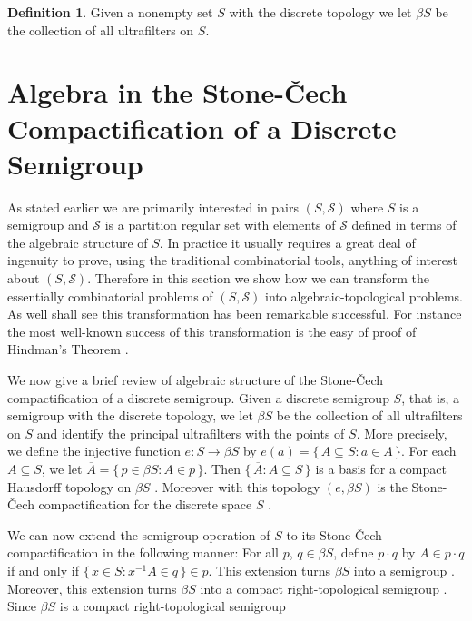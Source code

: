 \documentclass[12pt]{article}
\theoremstyle{plain}
\theoremstyle{definition}
\newtheorem{defn}[thm]{Definition}
\newcommand{\calS}{\mathcal{S}}
\begin{document}
\begin{defn}
  Given a nonempty set $S$ with the discrete topology we let $\beta S$ be the collection of all ultrafilters on $S$. 
\end{defn}

\section{Algebra in the Stone-\v{C}ech Compactification of a Discrete Semigroup}

As stated earlier we are primarily interested in pairs $(S, \calS)$ where $S$ is a semigroup and $\calS$ is a partition regular set with elements of $\calS$ defined in terms of the algebraic structure of $S$.
In practice it usually requires a great deal of ingenuity to prove, using the traditional combinatorial tools, anything of interest about $(S, \calS)$. 
Therefore in this section we show how we can transform the essentially combinatorial problems of $(S, \calS)$ into algebraic-topological problems. 
As well shall see this transformation has been remarkable successful.
For instance the most well-known success of this transformation is the easy of proof of Hindman's Theorem \cite[Corollary 5.9]{Hindman:1998fk}.

We now give a brief review of algebraic structure of the Stone-\v{C}ech compactification of a discrete semigroup.  
Given a discrete semigroup $S$, that is, a semigroup with the discrete topology, we let $\beta S$ be the collection of all ultrafilters on $S$ and identify the principal ultrafilters with the points of $S$.
More precisely, we define the injective function $e \colon S \to \beta S$ by $e(a) = \{\, A \subseteq S : a \in A \,\}$.
For each $A \subseteq S$, we let $\overline{A} = \{\, p \in \beta S : A \in p \,\}$.
Then $\{\, \overline{A} : A \subseteq S \,\}$ is a basis for a compact Hausdorff topology on $\beta S$ \cite[Theorem 3.18(a)]{Hindman:1998fk}. 
Moreover with this topology $(e, \beta S)$ is the Stone-\v{C}ech compactification for the discrete space $S$ \cite[Theorem 3.27]{Hindman:1998fk}. 

We can now extend the semigroup operation of $S$ to its Stone-\v{C}ech compactification in the following manner:  For all $p$, $q \in \beta S$, define $p \cdot q$ by $A \in p \cdot q$ if and only if $\{\, x \in S : x^{-1}A \in q \,\} \in p$. 
This extension turns $\beta S$ into a semigroup \cite[Theorem 4.1, Theorem 4.4, and Theorem 4.12]{Hindman:1998fk}. 
Moreover, this extension turns $\beta S$ into a compact right-topological semigroup \cite[Theorem 4.1(b)]{Hindman:1998fk}.
Since $\beta S$ is a compact right-topological semigroup 
\end{document}
